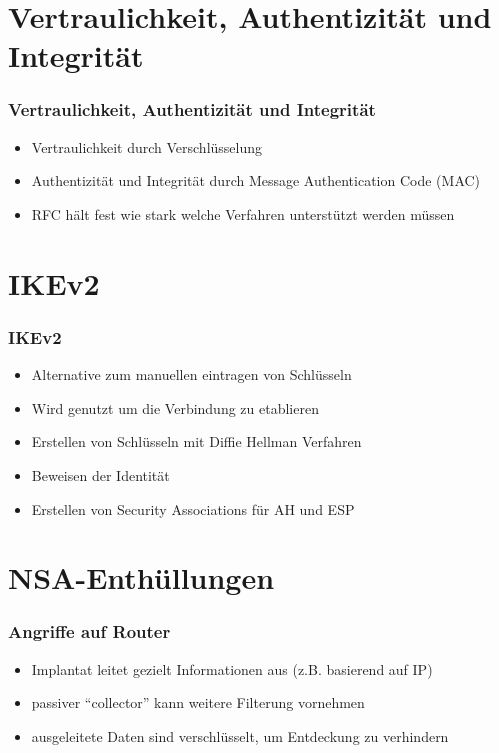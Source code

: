 \documentclass[t]{beamer}
\begin{document}
\section{Vertraulichkeit, Authentizität und Integrität}
\begin{frame}
	\frametitle{Vertraulichkeit, Authentizität und Integrität}
	\begin{itemize}
		\vfill
		\item Vertraulichkeit durch Verschlüsselung
		\vfill
		\item Authentizität und Integrität durch Message Authentication Code (MAC)
		\vfill
		\item RFC hält fest wie stark welche Verfahren unterstützt werden müssen
		\vfill
	\end{itemize}
\end{frame}

\section{IKEv2}
\begin{frame}
	\frametitle{IKEv2}
	\begin{itemize}
		\vfill
		\item Alternative zum manuellen eintragen von Schlüsseln
		\vfill
		\item Wird genutzt um die Verbindung zu etablieren
		\vfill
		\item Erstellen von Schlüsseln mit Diffie Hellman Verfahren
		\vfill
		\item Beweisen der Identität
		\vfill
		\item Erstellen von Security Associations für AH und ESP
		\vfill
	\end{itemize}
\end{frame}

\section{NSA-Enthüllungen}
\begin{frame}
	\frametitle{Angriffe auf Router}
	\begin{itemize}
		\item Implantat leitet gezielt Informationen aus (z.B. basierend auf IP)
		\item passiver "`collector"' kann weitere Filterung vornehmen
		\item ausgeleitete Daten sind verschlüsselt, um Entdeckung zu verhindern
	\end{itemize}
\end{frame}
\end{document}
